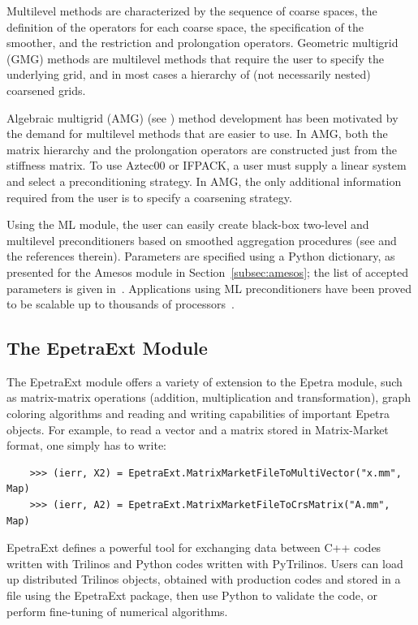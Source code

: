 \documentclass[acmtocl]{acmtrans2m}
\newcommand{\PyTrilinos}{{PyTrilinos}}
\begin{document}
Multilevel methods are characterized by the sequence of coarse spaces,
the definition of the operators for each coarse space, the
specification of the smoother, and the restriction and prolongation
operators.  Geometric multigrid (GMG) methods are multilevel methods
that require the user to specify the underlying grid, and in most
cases a hierarchy of (not necessarily nested) coarsened grids.

Algebraic multigrid (AMG) (see \cite[Section 8]{Briggs}) method
development has been motivated by the demand for multilevel methods
that are easier to use.  In AMG, both the matrix hierarchy and the
prolongation operators are constructed just from the stiffness matrix.
To use Aztec00 or IFPACK, a user must supply a linear system and
select a preconditioning strategy.  In AMG, the only additional
information required from the user is to specify a coarsening
strategy.

Using the ML module, the user can easily create black-box two-level
and multilevel preconditioners based on smoothed aggregation
procedures (see \cite{sala04analysis,brezina97robust} and the
references therein). Parameters are specified using a Python
dictionary, as presented for the Amesos module in
Section~\ref{subsec:amesos}; the list of accepted parameters is given
in~\cite{ml-guide}. Applications using ML preconditioners have been
proved to be scalable up to thousands of
processors~\cite{ijnme,shadid-jcp-dd-precond}.

\subsection{The EpetraExt Module}
\label{subsec:epetraext}

The EpetraExt module offers a variety of extension to the Epetra
module, such as matrix-matrix operations (addition, multiplication and
transformation), graph coloring algorithms and reading and writing
capabilities of important Epetra objects. For example, to read a
vector and a matrix stored in Matrix-Market format, one simply has to
write:
\begin{verbatim}
    >>> (ierr, X2) = EpetraExt.MatrixMarketFileToMultiVector("x.mm", Map)
    >>> (ierr, A2) = EpetraExt.MatrixMarketFileToCrsMatrix("A.mm", Map)
\end{verbatim}
EpetraExt defines a powerful tool for exchanging data between C++
codes written with Trilinos and Python codes written with
\PyTrilinos. Users can load up distributed Trilinos objects, obtained
with production codes and stored in a file using the EpetraExt
package, then use Python to validate the code, or perform fine-tuning
of numerical algorithms.
\end{document}
